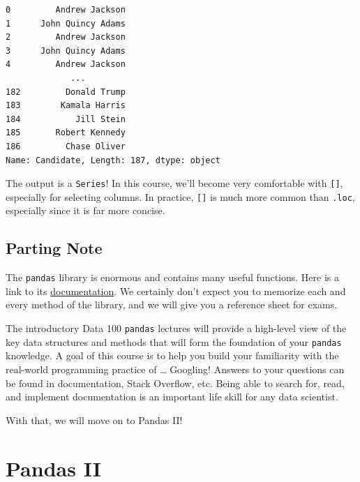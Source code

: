 \documentclass[
  letterpaper,
  DIV=11,
  numbers=noendperiod]{scrreprt}
\begin{document}
\begin{verbatim}
0         Andrew Jackson
1      John Quincy Adams
2         Andrew Jackson
3      John Quincy Adams
4         Andrew Jackson
             ...        
182         Donald Trump
183        Kamala Harris
184           Jill Stein
185       Robert Kennedy
186         Chase Oliver
Name: Candidate, Length: 187, dtype: object
\end{verbatim}

The output is a \texttt{Series}! In this course, we'll become very
comfortable with \texttt{{[}{]}}, especially for selecting columns. In
practice, \texttt{{[}{]}} is much more common than \texttt{.loc},
especially since it is far more concise.

\section{Parting Note}\label{parting-note}

The \texttt{pandas} library is enormous and contains many useful
functions. Here is a link to its
\href{https://pandas.pydata.org/docs/}{documentation}. We certainly
don't expect you to memorize each and every method of the library, and
we will give you a reference sheet for exams.

The introductory Data 100 \texttt{pandas} lectures will provide a
high-level view of the key data structures and methods that will form
the foundation of your \texttt{pandas} knowledge. A goal of this course
is to help you build your familiarity with the real-world programming
practice of \ldots{} Googling! Answers to your questions can be found in
documentation, Stack Overflow, etc. Being able to search for, read, and
implement documentation is an important life skill for any data
scientist.

With that, we will move on to Pandas II!


\chapter{Pandas II}\label{pandas-ii}
\end{document}
